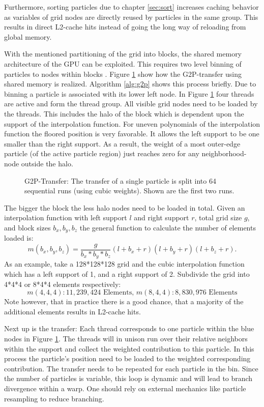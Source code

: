 \documentclass[m,times]{cgMA}
\begin{document}
Furthermore, sorting particles due to chapter \ref{sec:sort} increases caching behavior as variables of grid nodes are directly reused by particles in the same group. This results in direct L2-cache hits instead of going the long way of reloading from global memory.

With the mentioned partitioning of the grid into blocks, the shared memory architecture of the GPU can be exploited. This requires two level binning of particles to nodes within blocks \cite{MPM:GPU}. Figure \ref{fig:g2p_transfer} show how the G2P-transfer using shared memory is realized. Algorithm \ref{alg:g2p} shows this process briefly. Due to binning a particle is associated with its lower left node. In Figure \ref{fig:g2p_transfer} four threads are active and form the thread group. All visible grid nodes need to be loaded by the threads. This includes the halo of the block which is dependent upon the support of the interpolation function. For uneven polynomials of the interpolation function the floored position is very favorable. It allows the left support to be one smaller than the right support. As a result, the weight of a most outer-edge particle (of the active particle region) just reaches zero for any neighborhood-node outside the halo.

\begin{figure}[htbp]
    \centering
  
  \caption{G2P-Transfer: The transfer of a single particle is split into 64 sequential runs (using cubic weights). Shown are the first two runs.}
  \label{fig:g2p_transfer}
\end{figure}
The bigger the block the less halo nodes need to be loaded in total. Given an interpolation function with left support $l$ and right support $r$, total grid size $g$, and block sizes $b_x,b_y,b_z$ the general function to calculate the number of elements loaded is:
\begin{equation}
  m(b_x,b_y,b_z) = \frac{g}{b_x*b_y*b_z}(l+b_x+r)(l+b_y+r)(l+b_z+r).
\end{equation}
 As an example, take a 128*128*128 grid and the cubic interpolation function which has a left support of 1, and a right support of 2. Subdivide the grid into 4*4*4 or 8*4*4 elements respectively:
 $$m(4,4,4): 11,239,424\text{ Elements, }m(8,4,4):  8,830,976\text{ Elements}$$
Note however, that in practice there is a good chance, that a majority of the additional elements results in L2-cache hits.

Next up is the transfer: Each thread corresponds to one particle within the blue nodes in Figure \ref{fig:g2p_transfer}. The threads will in unison run over their relative neighbors within the support and collect the weighted contribution to this particle. In this process the particle's position need to be loaded to the weighted corresponding contribution. The transfer needs to be repeated for each particle in the bin. Since the number of particles is variable, this loop is dynamic and will lead to branch divergence within a warp. One should rely on external mechanics like particle resampling to reduce branching.
\end{document}
